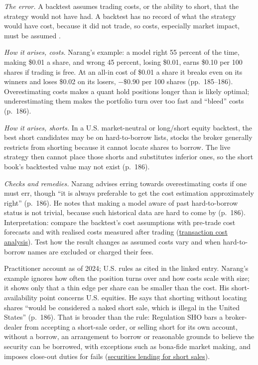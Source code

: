 \begin{qfpitfall}\label{pit:backtest-cost-short-assumptions}
 \emph{The error.} A backtest assumes trading costs, or the ability to short, that the strategy would not have had. A backtest has no record of what the strategy would have cost, because it did not trade, so costs, especially market impact, must be assumed \citep[chap.~``Research'', sec.~9.3.5, p.~185]{s7-narang}.

\emph{How it arises, costs.} Narang's example: a model right 55 percent of the time, making \$0.01 a share, and wrong 45 percent, losing \$0.01, earns \$0.10 per 100 shares if trading is free. At an all-in cost of \$0.01 a share it breaks even on its winners and loses \$0.02 on its losers, $-\$0.90$ per 100 shares (pp.~185--186). Overestimating costs makes a quant hold positions longer than is likely optimal; underestimating them makes the portfolio turn over too fast and ``bleed'' costs (p.~186).

\emph{How it arises, shorts.} In a U.S. market-neutral or long/short equity backtest, the best short candidates may be on hard-to-borrow lists, stocks the broker generally restricts from shorting because it cannot locate shares to borrow. The live strategy then cannot place those shorts and substitutes inferior ones, so the short book's backtested value may not exist (p.~186).

\emph{Checks and remedies.} Narang advises erring towards overestimating costs if one must err, though ``it is always preferable to get the cost estimation approximately right'' (p.~186). He notes that making a model aware of past hard-to-borrow status is not trivial, because such historical data are hard to come by (p.~186). Interpretation: compare the backtest's cost assumptions with pre-trade cost forecasts and with realised costs measured after trading (\hyperref[meth:transaction-cost-analysis]{transaction cost analysis}). Test how the result changes as assumed costs vary and when hard-to-borrow names are excluded or charged their fees.

 Practitioner account as of 2024; U.S. rules as cited in the linked entry. Narang's example ignores how often the position turns over and how costs scale with size; it shows only that a thin edge per share can be smaller than the cost. His short-availability point concerns U.S. equities. He says that shorting without locating shares ``would be considered a naked short sale, which is illegal in the United States'' (p.~186). That is broader than the rule: Regulation SHO bars a broker-dealer from accepting a short-sale order, or selling short for its own account, without a borrow, an arrangement to borrow or reasonable grounds to believe the security can be borrowed, with exceptions such as bona-fide market making, and imposes close-out duties for fails (\hyperref[mech:securities-lending-short-sale]{securities lending for short sales}).


\end{qfpitfall}
